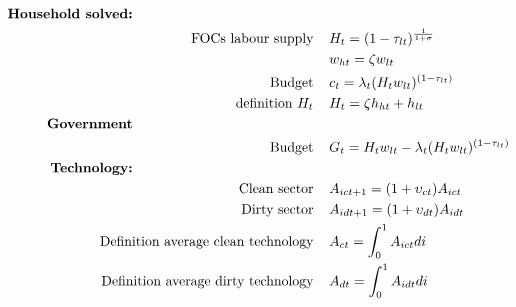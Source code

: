 \begin{align*}
\text{\textbf{Household solved:}} \hspace{50mm}& \\
\text{FOCs labour supply}\hspace{4mm}&  %
H_t=(1-\tau_{lt})^\frac{1}{1+\sigma}\\
\ \hspace{4mm} & %
w_{ht}=\zeta w_{lt}\\
\text{Budget}\hspace{4mm}&  %
c_t= \lambda_t (H_tw_{lt})^{(1-\tau_{lt})}\\
\text{definition}\  H_t\hspace{4mm} & %
H_t=\zeta h_{ht}+h_{lt}
\\
%
\text{\textbf{Government}}\hspace{50mm}& \nonumber\\
\text{Budget}\hspace{4mm}& G_t=H_tw_{lt}-\lambda_t(H_t w_{lt})^{(1-\tau_{lt})}
\\
\text{\textbf{Technology:}}\hspace{50mm}&\\
\text{Clean sector}\hspace{4mm}& A_{ict+1}=(1+\upsilon_{ct})A_{ict}\\
\text{Dirty sector}\hspace{4mm}& A_{idt+1}=(1+\upsilon_{dt})A_{idt}\\
\text{Definition average clean technology}\hspace{4mm}& A_{ct}=\int_0^1A_{ict}di\\
\text{Definition average dirty technology}\hspace{4mm}& A_{dt}=\int_0^1A_{idt}di
\end{align*}


